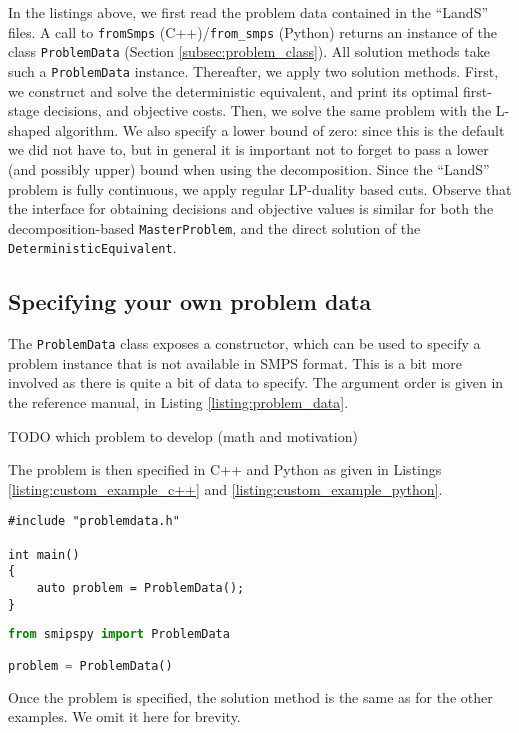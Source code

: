 \documentclass[12pt, english]{article}
\begin{document}
In the listings above, we first read the problem data contained in the ``LandS'' files. A call to \texttt{fromSmps} (C++)/\texttt{from\_smps} (Python) returns an instance of the class \texttt{ProblemData} (Section \ref{subsec:problem_class}). All solution methods take such a \texttt{ProblemData} instance. Thereafter, we apply two solution methods. First, we construct and solve the deterministic equivalent, and print its optimal first-stage decisions, and objective costs. Then, we solve the same problem with the L-shaped algorithm. We also specify a lower bound of zero: since this is the default we did not have to, but in general it is important not to forget to pass a lower (and possibly upper) bound when using the decomposition. Since the ``LandS'' problem is fully continuous, we apply regular LP-duality based cuts. Observe that the interface for obtaining decisions and objective values is similar for both the decomposition-based \texttt{MasterProblem}, and the direct solution of the \texttt{DeterministicEquivalent}.

\subsection{Specifying your own problem data}
\label{subsec:own_data_example}

The \texttt{ProblemData} class exposes a constructor, which can be used to specify a problem instance that is not available in SMPS format. This is a bit more involved as there is quite a bit of data to specify. The argument order is given in the reference manual, in Listing \ref{listing:problem_data}.

TODO which problem to develop (math and motivation)

The problem is then specified in C++ and Python as given in Listings \ref{listing:custom_example_c++} and \ref{listing:custom_example_python}.

\begin{lstlisting}[caption={Specifying a custom problem in C++.},
label={listing:custom_example_c++}]
#include "problemdata.h"

int main()
{
	auto problem = ProblemData();
}
\end{lstlisting}
\begin{lstlisting}[caption={Specifying a custom problem in Python.},
label={listing:custom_example_python},
language={Python}]
from smipspy import ProblemData

problem = ProblemData()
\end{lstlisting}
Once the problem is specified, the solution method is the same as for the other examples. We omit it here for brevity.
\end{document}
